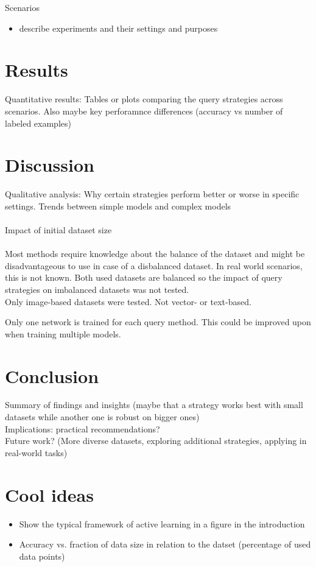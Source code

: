 \documentclass{article}
\theoremstyle{plain}
\theoremstyle{definition}
\theoremstyle{remark}
\begin{document}
	

Scenarios
\begin{itemize}
	\item describe experiments and their settings and purposes
\end{itemize}

\section{Results}\label{sec:results}
Quantitative results: Tables or plots comparing the query strategies across scenarios. Also maybe key perforamnce differences (accuracy vs number of labeled examples)

\section{Discussion}\label{sec:discussion}
Qualitative analysis: Why certain strategies perform better or worse in specific settings. Trends between simple models and complex models
\\
\\
Impact of initial dataset size
\\
\\
Most methods require knowledge about the balance of the dataset and might be disadvantageous to use in case of a disbalanced dataset. In real world scenarios, this is not known. Both used datasets are balanced so the impact of query strategies on imbalanced datasets was not tested. \\
Only image-based datasets were tested. Not vector- or text-based. 

Only one network is trained for each query method. This could be improved upon when training multiple models.

\section{Conclusion}\label{sec:conclusion}
Summary of findings and insights (maybe that a strategy works best with small datasets while another one is robust on bigger ones)
\\
Implications: practical recommendations?
\\
Future work? (More diverse datasets, exploring additional strategies, applying in real-world tasks)

\newpage

\section{Cool ideas}
\begin{itemize}
	\item Show the typical framework of active learning in a figure in the introduction
	\item Accuracy vs. fraction of data size in relation to the datset (percentage of used data points)
\end{itemize}
\end{document}
